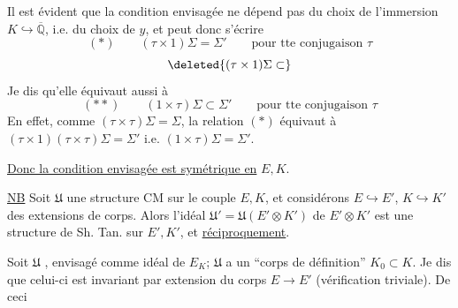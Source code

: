 Il est évident que la condition envisagée ne dépend pas du choix de l'immersion
$K\hookrightarrow\overline{\mathbb Q}$,  i.e. du choix de $y$,
et peut donc s'écrire
\[
(*)\qquad(\tau\times1)\Sigma=\Sigma'\qquad\text{pour tte conjugaison }\tau
\]
\[\deleted{(\tau\times1)\Sigma\subset}\]
Je dis qu'elle équivaut aussi à
\[
(**)\qquad(1\times\tau)\Sigma\subset\Sigma'\qquad\text{pour tte conjugaison }\tau
\]
En effet, comme $(\tau\times\tau)\Sigma=\Sigma$, la relation $(*)$ équivaut à
$(\tau\times1)(\tau\times\tau)\Sigma=\Sigma'$ i.e. $(1\times\tau)\Sigma=\Sigma'$.

\uline{Donc la condition envisagée est symétrique en} $E,K$.

\par\noindent
{}
\par

\uline{NB} Soit $\mathfrak U$ une structure CM sur le couple $E,K$,
et considérons $E\hookrightarrow E'$, $K\hookrightarrow K'$ des extensions de corps.
Alors l'idéal $\mathfrak U'=\mathfrak U(E'\otimes K')$ de $E'\otimes K'$ est une structure
 de Sh. Tan. sur $E',K'$, et \uline{réciproquement}.

 Soit $\mathfrak U$
 , envisagé
comme idéal de $E_K$; $\mathfrak U$ a un ``corps de définition'' $K_0\subset K$.
Je dis que celui-ci est invariant par extension du corps $E\longrightarrow E'$
(vérification triviale). De ceci
